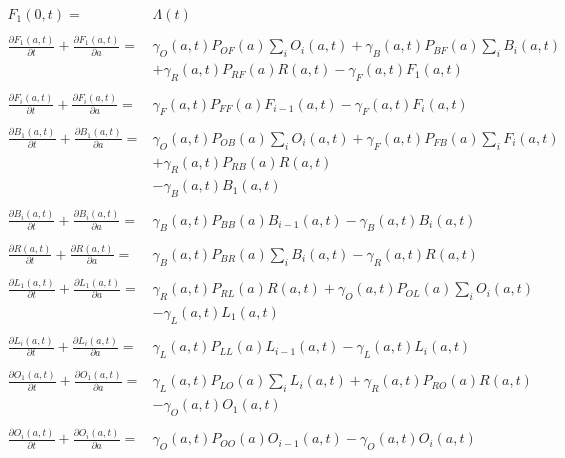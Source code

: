 \documentclass{article}
\begin{document}
\begin{equation}\begin{array}{rl}
F_1(0,t)=& \Lambda(t) \\ &\\
%
\frac{\partial F_1(a,t)}{\partial t} + \frac{\partial F_1(a,t)}{\partial a} =& 
\gamma_O(a,t) P_{OF}(a) \sum_i O_i(a,t) 
+ \gamma_B(a,t) P_{BF}(a)  \sum_i B_i(a,t) \\&
+ \gamma_R(a,t) P_{RF}(a) R(a,t) 
- \gamma_F(a,t) F_1(a,t) \\ &\\
%
\frac{\partial F_i(a,t)}{\partial t} + \frac{\partial F_i(a,t)}{\partial a} =& \gamma_F(a,t) P_{FF}(a) F_{i-1} (a,t) - \gamma_F(a,t) F_i(a,t) \\ &\\
%
%
\frac{\partial B_1(a,t)}{\partial t} + \frac{\partial B_1(a,t)}{\partial a} =&  
\gamma_O(a,t) P_{OB}(a) \sum_i O_i(a,t) 
+ \gamma_F(a,t) P_{FB}(a) \sum_i F_i(a,t)\\& 
+ \gamma_R(a,t) P_{RB}(a) R(a,t)
\\&
- \gamma_B(a,t) B_1(a,t) \\ &\\
%
\frac{\partial B_i(a,t)}{\partial t} + \frac{\partial B_i(a,t)}{\partial a} =& \gamma_B(a,t) P_{BB}(a) B_{i-1}(a,t) -
\gamma_B(a,t) B_i(a,t) 
\\&\\
%
\frac{\partial R(a,t)}{\partial t} + \frac{\partial R(a,t)}{\partial a} =&  \gamma_B(a,t) P_{BR}(a) \sum_i B_i(a,t) - \gamma_R(a,t) R(a,t)\\ &\\
%
\frac{\partial L_1(a,t)}{\partial t} + \frac{\partial L_1(a,t)}{\partial a} =& \gamma_R(a,t) P_{RL}(a) R(a,t) + 
\gamma_O(a,t) P_{OL}(a) \sum_i O_i(a,t)\\& - \gamma_L(a,t) L_1(a,t)
\\ &\\
%
\frac{\partial L_i(a,t)}{\partial t} + \frac{\partial L_i(a,t)}{\partial a} =& \gamma_L(a,t) P_{LL}(a) L_{i-1} (a,t) - \gamma_L(a,t) L_i(a,t)
\\ &\\
%
\frac{\partial O_1(a,t)}{\partial t} + \frac{\partial O_1(a,t)}{\partial a} =& \gamma_L(a,t) P_{LO}(a) \sum_i L_i(a,t) 
+ \gamma_R(a,t) P_{RO}(a) R(a,t) \\&
- \gamma_O(a,t) O_1(a,t)
\\ &\\
%
\frac{\partial O_i(a,t)}{\partial t} + \frac{\partial O_i(a,t)}{\partial a} =& \gamma_O(a,t) P_{OO}(a) O_{i-1} (a,t)   - \gamma_O(a,t) O_i(a,t)
\\ 
%
\end{array}\end{equation}
\end{document}
